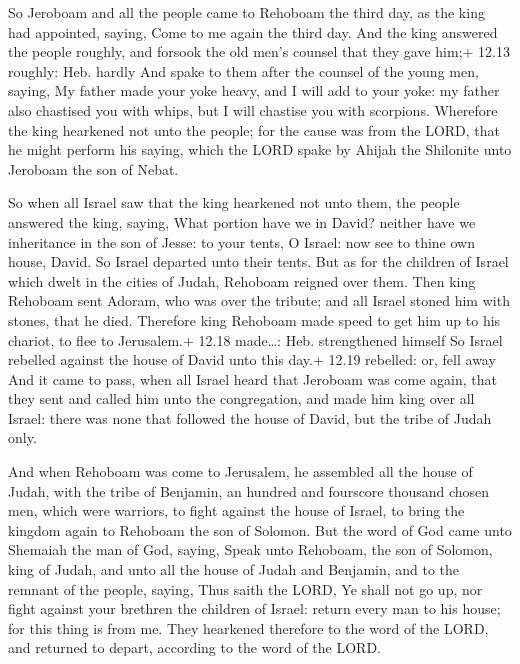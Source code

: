  So Jeroboam and all the people came to Rehoboam the
third day, as the king had appointed, saying, Come to me again the third
day.  And the king answered the people roughly, and forsook
the old men's counsel that they gave him;+ 12.13 roughly: Heb. hardly
 And spake to them after the counsel of the young men,
saying, My father made your yoke heavy, and I will add to your yoke: my
father also chastised you with whips, but I will chastise you with
scorpions.  Wherefore the king hearkened not unto the
people; for the cause was from the LORD, that he might perform his
saying, which the LORD spake by Ahijah the Shilonite unto Jeroboam the
son of Nebat.

 So when all Israel saw that the king hearkened not unto
them, the people answered the king, saying, What portion have we in
David? neither have we inheritance in the son of Jesse: to your tents, O
Israel: now see to thine own house, David. So Israel departed unto their
tents.  But as for the children of Israel which dwelt in
the cities of Judah, Rehoboam reigned over them.  Then king
Rehoboam sent Adoram, who was over the tribute; and all Israel stoned
him with stones, that he died. Therefore king Rehoboam made speed to get
him up to his chariot, to flee to Jerusalem.+ 12.18 made\ldots: Heb.
strengthened himself  So Israel rebelled against the house
of David unto this day.+ 12.19 rebelled: or, fell away  And
it came to pass, when all Israel heard that Jeroboam was come again,
that they sent and called him unto the congregation, and made him king
over all Israel: there was none that followed the house of David, but
the tribe of Judah only.

 And when Rehoboam was come to Jerusalem, he assembled
all the house of Judah, with the tribe of Benjamin, an hundred and
fourscore thousand chosen men, which were warriors, to fight against the
house of Israel, to bring the kingdom again to Rehoboam the son of
Solomon.  But the word of God came unto Shemaiah the man of
God, saying,  Speak unto Rehoboam, the son of Solomon, king
of Judah, and unto all the house of Judah and Benjamin, and to the
remnant of the people, saying,  Thus saith the LORD, Ye
shall not go up, nor fight against your brethren the children of Israel:
return every man to his house; for this thing is from me. They hearkened
therefore to the word of the LORD, and returned to depart, according to
the word of the LORD.

